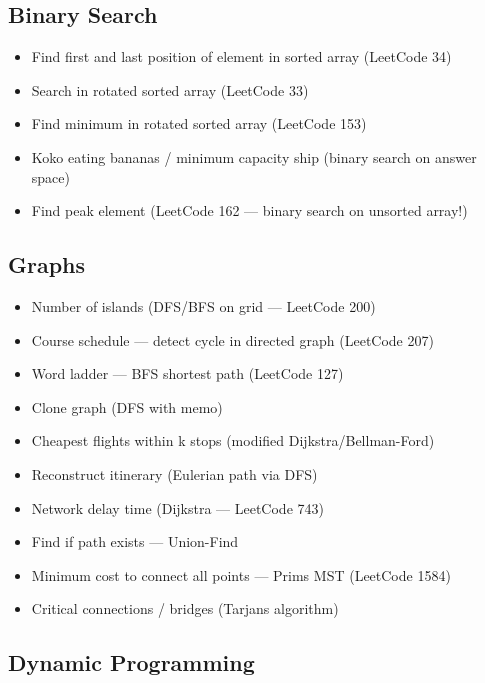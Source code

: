 \documentclass[11pt]{article}
\providecommand{\tightlist}{\setlength{\itemsep}{1pt}\setlength{\parskip}{0pt}}
\begin{document}
\subsection{Binary Search}\label{binary-search-1}

\begin{itemize}
\tightlist
\item
  Find first and last position of element in sorted array (LeetCode 34)
\item
  Search in rotated sorted array (LeetCode 33)
\item
  Find minimum in rotated sorted array (LeetCode 153)
\item
  Koko eating bananas / minimum capacity ship (binary search on answer space)
\item
  Find peak element (LeetCode 162 --- binary search on unsorted array!)
\end{itemize}

\subsection{Graphs}\label{graphs}

\begin{itemize}
\tightlist
\item
  Number of islands (DFS/BFS on grid --- LeetCode 200)
\item
  Course schedule --- detect cycle in directed graph (LeetCode 207)
\item
  Word ladder --- BFS shortest path (LeetCode 127)
\item
  Clone graph (DFS with memo)
\item
  Cheapest flights within k stops (modified Dijkstra/Bellman-Ford)
\item
  Reconstruct itinerary (Eulerian path via DFS)
\item
  Network delay time (Dijkstra --- LeetCode 743)
\item
  Find if path exists --- Union-Find
\item
  Minimum cost to connect all points --- Prim\textquotesingle s MST (LeetCode 1584)
\item
  Critical connections / bridges (Tarjan\textquotesingle s algorithm)
\end{itemize}

\subsection{Dynamic Programming}\label{dynamic-programming-1}
\end{document}
